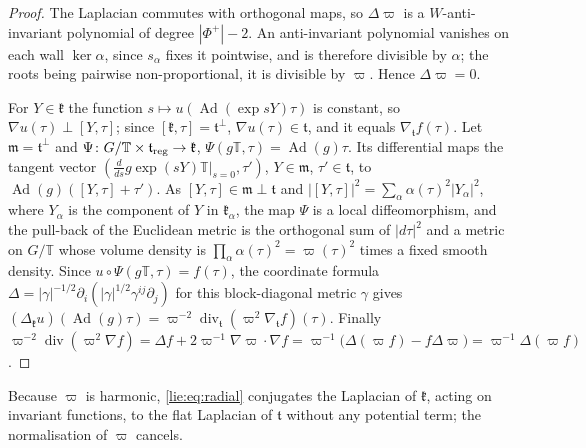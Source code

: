\documentclass[11pt]{amsart}
\theoremstyle{definition}
\theoremstyle{remark}
\numberwithin{equation}{section}
\newcommand{\Ad}{\operatorname{Ad}}
\newcommand{\kf}{\mathfrak{k}}
\newcommand{\tf}{\mathfrak{t}}
\begin{document}
\begin{proof}
The Laplacian commutes with orthogonal maps, so $\Delta\varpi$ is a $W$-anti-invariant polynomial of degree $|\Phi^+|-2$. An anti-invariant polynomial vanishes on each wall $\ker\alpha$, since $s_\alpha$ fixes it pointwise, and is therefore divisible by $\alpha$; the roots being pairwise non-proportional, it is divisible by $\varpi$. Hence $\Delta\varpi=0$.

For $Y\in\kf$ the function $s\mapsto u(\Ad(\exp sY)\tau)$ is constant, so $\nabla u(\tau)\perp[Y,\tau]$; since $[\kf,\tau]=\tf^\perp$, $\nabla u(\tau)\in\tf$, and it equals $\nabla_\tf f(\tau)$. Let $\mathfrak m=\tf^\perp$ and $\Psi\colon G/\mathbb T\times\tf_{\rm reg}\to\kf$, $\Psi(g\mathbb T,\tau)=\Ad(g)\tau$. Its differential maps the tangent vector $(\frac{d}{ds}g\exp(sY)\mathbb T|_{s=0},\tau')$, $Y\in\mathfrak m$, $\tau'\in\tf$, to $\Ad(g)([Y,\tau]+\tau')$. As $[Y,\tau]\in\mathfrak m\perp\tf$ and $|[Y,\tau]|^2=\sum_\alpha\alpha(\tau)^2|Y_\alpha|^2$, where $Y_\alpha$ is the component of $Y$ in $\kf_\alpha$, the map $\Psi$ is a local diffeomorphism, and the pull-back of the Euclidean metric is the orthogonal sum of $|d\tau|^2$ and a metric on $G/\mathbb T$ whose volume density is $\prod_\alpha\alpha(\tau)^2=\varpi(\tau)^2$ times a fixed smooth density. Since $u\circ\Psi(g\mathbb T,\tau)=f(\tau)$, the coordinate formula $\Delta=|\gamma|^{-1/2}\partial_i(|\gamma|^{1/2}\gamma^{ij}\partial_j)$ for this block-diagonal metric $\gamma$ gives $(\Delta_\kf u)(\Ad(g)\tau)=\varpi^{-2}\operatorname{div}_\tf(\varpi^2\nabla_\tf f)(\tau)$. Finally $\varpi^{-2}\operatorname{div}(\varpi^2\nabla f)=\Delta f+2\varpi^{-1}\nabla\varpi\cdot\nabla f=\varpi^{-1}\big(\Delta(\varpi f)-f\Delta\varpi\big)=\varpi^{-1}\Delta(\varpi f)$.
\end{proof}

Because $\varpi$ is harmonic, \eqref{lie:eq:radial} conjugates the Laplacian of $\kf$, acting on invariant functions, to the flat Laplacian of $\tf$ without any potential term; the normalisation of $\varpi$ cancels.
\end{document}
